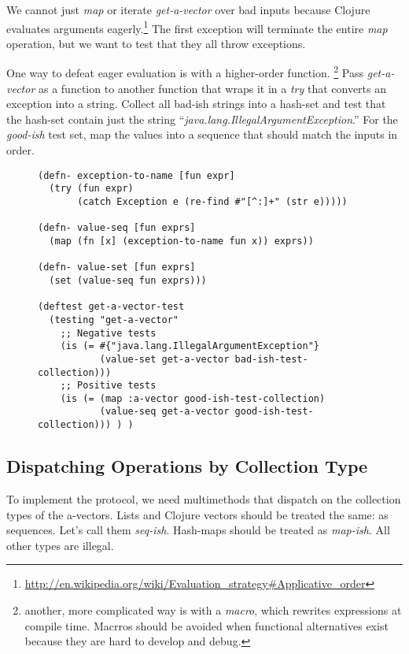\documentclass[11pt]{article}
\begin{document}
We cannot just \emph{map} or iterate \emph{get-a-vector} over bad inputs
because Clojure evaluates arguments
eagerly.\footnote{\url{http://en.wikipedia.org/wiki/Evaluation_strategy#Applicative_order}}
The first exception will terminate the entire \emph{map} operation, but we
want to test that they all throw exceptions.

One way to defeat eager evaluation is with a higher-order function.
\footnote{another, more complicated way is with a \emph{macro}, which rewrites
   expressions at compile time. Macrros should be avoided when
   functional alternatives exist because they are hard to develop and
   debug.}  Pass \emph{get-a-vector} as a function to another function that
wraps it in a \emph{try} that converts an exception into a string.
Collect all bad-ish strings into a hash-set and test that the
hash-set contain just the string
``\emph{java.lang.IllegalArgumentException}.'' For the \emph{good-ish}
test set, map the values into a sequence that should match the inputs
in order.

\begin{figure}[H]
\label{get-a-vector-test}
\begin{verbatim}
(defn- exception-to-name [fun expr]
  (try (fun expr)
       (catch Exception e (re-find #"[^:]+" (str e)))))

(defn- value-seq [fun exprs]
  (map (fn [x] (exception-to-name fun x)) exprs))

(defn- value-set [fun exprs]
  (set (value-seq fun exprs)))

(deftest get-a-vector-test
  (testing "get-a-vector"
    ;; Negative tests
    (is (= #{"java.lang.IllegalArgumentException"}
           (value-set get-a-vector bad-ish-test-collection)))
    ;; Positive tests
    (is (= (map :a-vector good-ish-test-collection)
           (value-seq get-a-vector good-ish-test-collection))) ) )
\end{verbatim}
\end{figure}
\subsection{Dispatching Operations by Collection Type}
\label{sec-4-5}

To implement the protocol, we need multimethods that dispatch on the
collection types of the a-vectors. Lists and Clojure vectors should
be treated the same: as sequences. Let's call them
\emph{seq-ish}. Hash-maps should be treated as \emph{map-ish}. All other types
are illegal.
\end{document}

